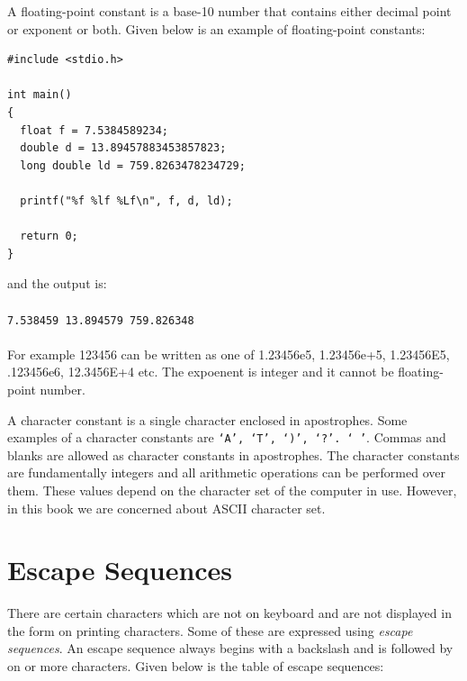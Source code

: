 A floating-point constant is a base-10 number that contains either decimal
point or exponent or both. Given below is an example of floating-point
constants:

\begin{Verbatim}[frame=single]
#include <stdio.h>

int main()
{
  float f = 7.5384589234;
  double d = 13.89457883453857823;
  long double ld = 759.8263478234729;

  printf("%f %lf %Lf\n", f, d, ld);

  return 0;
}
\end{Verbatim}

and the output is:
\\\\\texttt{7.538459 13.894579 759.826348\\\\}
For example 123456 can be written as one of 1.23456e5, 1.23456e+5, 1.23456E5,
.123456e6, 12.3456E+4 etc. The expoenent is integer and it cannot be
floating-point number.

A character constant is a single character enclosed in apostrophes. Some
examples of a character constants are \texttt{`A', `T', `)', `?'. ` '}. Commas
and blanks are allowed as character constants in apostrophes. The character
constants are fundamentally integers and all arithmetic operations can be
performed over them. These values depend on the character set of the computer
in use. However, in this book we are concerned about ASCII character set.

\section{Escape Sequences}
There are certain characters which are not on keyboard and are not displayed in
the form on printing characters. Some of these are expressed using
\textit{escape sequences}. An escape sequence always begins with a backslash
and is followed by on or more characters. Given below is the table of escape
sequences:

